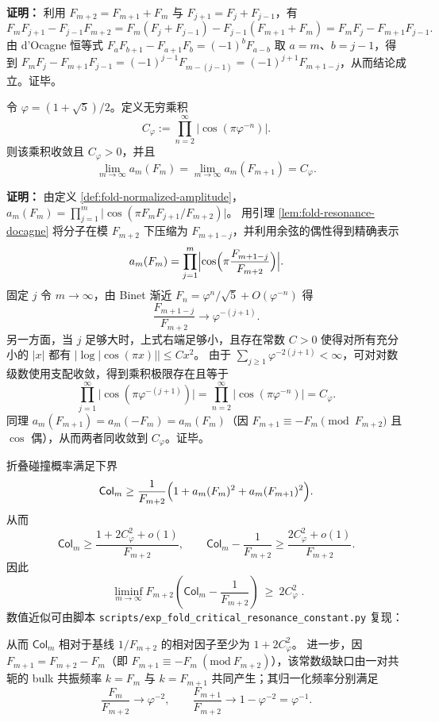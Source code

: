 \textbf{证明：}
利用 \(F_{m+2}=F_{m+1}+F_m\) 与 \(F_{j+1}=F_j+F_{j-1}\)，有
\[
F_mF_{j+1}-F_{j-1}F_{m+2}
=F_m(F_j+F_{j-1})-F_{j-1}(F_{m+1}+F_m)
=F_mF_j-F_{m+1}F_{j-1}.
\]
由 d'Ocagne 恒等式
\(
F_aF_{b+1}-F_{a+1}F_b=(-1)^bF_{a-b}
\)
取 \(a=m\)、\(b=j-1\)，得到
\(
F_mF_j-F_{m+1}F_{j-1}=(-1)^{j-1}F_{m-(j-1)}=(-1)^{j+1}F_{m+1-j}
\)，从而结论成立。证毕。

\begin{theorem}\label{thm:fold-critical-resonance-constant}
令 \(\varphi=(1+\sqrt5)/2\)。定义无穷乘积
\[
C_\varphi:=\prod_{n=2}^{\infty}\bigl|\cos(\pi \varphi^{-n})\bigr|.
\]
则该乘积收敛且 \(C_\varphi>0\)，并且
\[
\lim_{m\to\infty}a_m(F_m)=\lim_{m\to\infty}a_m(F_{m+1})=C_\varphi.
\]
\end{theorem}

\textbf{证明：}
由定义 \ref{def:fold-normalized-amplitude}，
\(
a_m(F_m)=\prod_{j=1}^m\bigl|\cos(\pi F_mF_{j+1}/F_{m+2})\bigr|
\)。
用引理 \ref{lem:fold-resonance-docagne} 将分子在模 \(F_{m+2}\) 下压缩为 \(F_{m+1-j}\)，并利用余弦的偶性得到精确表示
\[
a_m(F_m)=\prod_{j=1}^m\Bigl|\cos\Bigl(\pi \frac{F_{m+1-j}}{F_{m+2}}\Bigr)\Bigr|.
\]
固定 \(j\) 令 \(m\to\infty\)，由 Binet 渐近 \(F_n=\varphi^n/\sqrt5+O(\varphi^{-n})\) 得
\[
\frac{F_{m+1-j}}{F_{m+2}}\to \varphi^{-(j+1)}.
\]
另一方面，当 \(j\) 足够大时，上式右端足够小，且存在常数 \(C>0\) 使得对所有充分小的 \(|x|\) 都有
\(
|\log|\cos(\pi x)||\le Cx^2
\)。
由于 \(\sum_{j\ge 1}\varphi^{-2(j+1)}<\infty\)，可对对数级数使用支配收敛，得到乘积极限存在且等于
\[
\prod_{j=1}^{\infty}\bigl|\cos(\pi \varphi^{-(j+1)})\bigr|
=\prod_{n=2}^{\infty}\bigl|\cos(\pi \varphi^{-n})\bigr|
=C_\varphi.
\]
同理 \(a_m(F_{m+1})=a_m(-F_m)=a_m(F_m)\)（因 \(F_{m+1}\equiv -F_m\pmod{F_{m+2}}\) 且 \(\cos\) 偶），从而两者同收敛到 \(C_\varphi\)。证毕。

\begin{corollary}[不可消除的常数级均匀性缺口]\label{cor:fold-critical-resonance-gap}
折叠碰撞概率满足下界
\[
\mathsf{Col}_m
\ge
\frac{1}{F_{m+2}}\Bigl(1+a_m(F_m)^2+a_m(F_{m+1})^2\Bigr).
\]
从而
\[
\mathsf{Col}_m
\ge \frac{1+2C_\varphi^2+o(1)}{F_{m+2}},
\qquad
\mathsf{Col}_m-\frac{1}{F_{m+2}}
\ge \frac{2C_\varphi^2+o(1)}{F_{m+2}}.
\]
因此
\[
\boxed{\;
\liminf_{m\to\infty}F_{m+2}\!\left(\mathsf{Col}_m-\frac{1}{F_{m+2}}\right)\ \ge\ 2C_\varphi^2\; }.
\]
数值近似可由脚本 \texttt{scripts/exp\_fold\_critical\_resonance\_constant.py} 复现：

从而 \(\mathsf{Col}_m\) 相对于基线 \(1/F_{m+2}\) 的相对因子至少为 \(1+2C_\varphi^2\)。
进一步，因 \(F_{m+1}=F_{m+2}-F_m\)（即 \(F_{m+1}\equiv -F_m\ (\mathrm{mod}\ F_{m+2})\)），该常数级缺口由一对共轭的 bulk 共振频率 \(k=F_m\) 与 \(k=F_{m+1}\) 共同产生；其归一化频率分别满足
\[
\frac{F_m}{F_{m+2}}\to \varphi^{-2},\qquad
\frac{F_{m+1}}{F_{m+2}}\to 1-\varphi^{-2}=\varphi^{-1}.
\]
\end{corollary}

